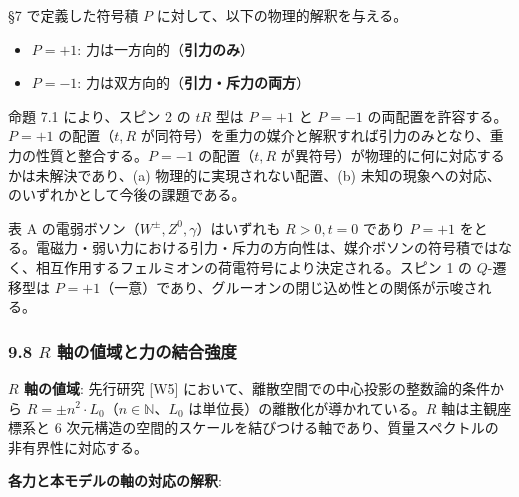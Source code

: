 \documentclass[
  a4paper,11pt]{ltjsarticle}
\providecommand{\tightlist}{%
  \setlength{\itemsep}{0pt}\setlength{\parskip}{0pt}}
\theoremstyle{definition}
\theoremstyle{remark}
\begin{document}
§7 で定義した符号積 \(P\) に対して、以下の物理的解釈を与える。

\begin{itemize}
\tightlist
\item
  \(P = +1\): 力は一方向的（\textbf{引力のみ}）
\item
  \(P = -1\): 力は双方向的（\textbf{引力・斥力の両方}）
\end{itemize}

命題 7.1 により、スピン 2 の \(tR\) 型は \(P = +1\) と \(P = -1\)
の両配置を許容する。\(P = +1\) の配置（\(t, R\)
が同符号）を重力の媒介と解釈すれば引力のみとなり、重力の性質と整合する。\(P = -1\)
の配置（\(t, R\) が異符号）が物理的に何に対応するかは未解決であり、(a)
物理的に実現されない配置、(b)
未知の現象への対応、のいずれかとして今後の課題である。

表 A の電弱ボソン（\(W^\pm, Z^0, \gamma\)）はいずれも \(R > 0, t = 0\)
であり \(P = +1\)
をとる。電磁力・弱い力における引力・斥力の方向性は、媒介ボソンの符号積ではなく、相互作用するフェルミオンの荷電符号により決定される。スピン
1 の \(Q\)-遷移型は
\(P = +1\)（一意）であり、グルーオンの閉じ込め性との関係が示唆される。

\subsubsection{\texorpdfstring{9.8 \(R\)
軸の値域と力の結合強度}{9.8 R 軸の値域と力の結合強度}}\label{r-ux8ef8ux306eux5024ux57dfux3068ux529bux306eux7d50ux5408ux5f37ux5ea6}

\textbf{\(R\) 軸の値域}: 先行研究 {[}W5{]}
において、離散空間での中心投影の整数論的条件から
\(R = \pm n^2 \cdot L_0\)（\(n \in \mathbb{N}\)、\(L_0\)
は単位長）の離散化が導かれている。\(R\) 軸は主観座標系と 6
次元構造の空間的スケールを結びつける軸であり、質量スペクトルの非有界性に対応する。

\textbf{各力と本モデルの軸の対応の解釈}:
\end{document}
